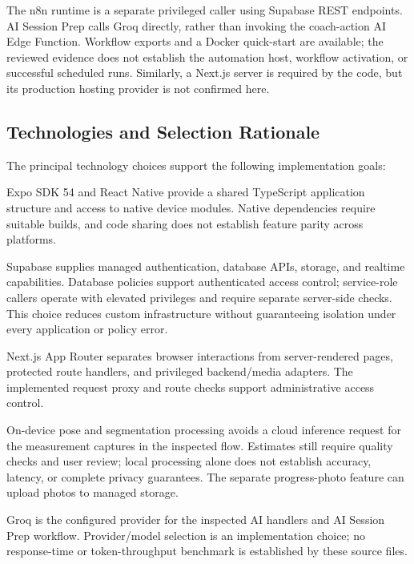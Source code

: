 \documentclass[12pt,a4paper,openany]{report}
\begin{document}
The n8n runtime is a separate privileged caller using Supabase REST endpoints. AI Session Prep calls Groq directly, rather than invoking the coach-action AI Edge Function. Workflow exports and a Docker quick-start are available; the reviewed evidence does not establish the automation host, workflow activation, or successful scheduled runs. Similarly, a Next.js server is required by the code, but its production hosting provider is not confirmed here.

\subsection{Technologies and Selection Rationale}

The principal technology choices support the following implementation goals:

\noindent\textbullet\enspace Expo SDK 54 and React Native provide a shared TypeScript application structure and access to native device modules. Native dependencies require suitable builds, and code sharing does not establish feature parity across platforms.\par

\noindent\textbullet\enspace Supabase supplies managed authentication, database APIs, storage, and realtime capabilities. Database policies support authenticated access control; service-role callers operate with elevated privileges and require separate server-side checks. This choice reduces custom infrastructure without guaranteeing isolation under every application or policy error.\par

\noindent\textbullet\enspace Next.js App Router separates browser interactions from server-rendered pages, protected route handlers, and privileged backend/media adapters. The implemented request proxy and route checks support administrative access control.\par

\noindent\textbullet\enspace On-device pose and segmentation processing avoids a cloud inference request for the measurement captures in the inspected flow. Estimates still require quality checks and user review; local processing alone does not establish accuracy, latency, or complete privacy guarantees. The separate progress-photo feature can upload photos to managed storage.\par

\noindent\textbullet\enspace Groq is the configured provider for the inspected AI handlers and AI Session Prep workflow. Provider/model selection is an implementation choice; no response-time or token-throughput benchmark is established by these source files.\par
\end{document}
